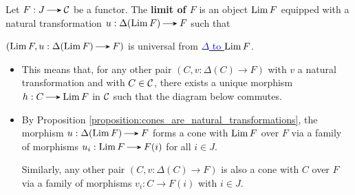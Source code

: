     \begin{definition}[Limits]\label{definition:limit_of_a_functor}
        Let $F: J \to \cc$ be a functor. The \textbf{limit of $F$} 
        is an object $\operatorname*{\mathrm{Lim }} F$ equipped with a natural transformation 
        $u: \Delta(\Lim F) \to F$ such that 
        \begin{center}
            $(\Lim F, u: \Delta(\Lim F) \to F)$ is universal from 
            \hyperref[definition:universal_morphism_from_F_to_D]{\textcolor{blue}{$\Delta$ to $\operatorname*{\mathrm{Lim }} F$}}.
        \end{center}
        \begin{itemize}
            \item This means that, for any other pair $(C, v: \Delta(C) \to F)$ with $v$ a natural transformation
            and with $C \in \mathcal{C}$, there exists a unique morphism $h: C \to \Lim F$ in $\mathcal{C}$ such that 
            the diagram below commutes. 
            \begin{center}
                \hspace{1cm}
            \end{center}

            \item By Proposition \ref{proposition:cones_are_natural_transformations}, 
            the morphism $u: \Delta(\Lim F) \to F$ forms a cone with $\operatorname*{\mathrm{Lim }} F$ over $F$ via 
            a family of morphisms $u_i: \Lim F \to F(i)$ for all $i \in J$. 
            
            Similarly, any other pair $(C, v: \Delta(C) \to F)$ is also a cone with $C$ over $F$ 
            via a family of morphisms $v_i: C \to F(i)$ with $i \in J$. 
            

\end{itemize}
\end{definition}
